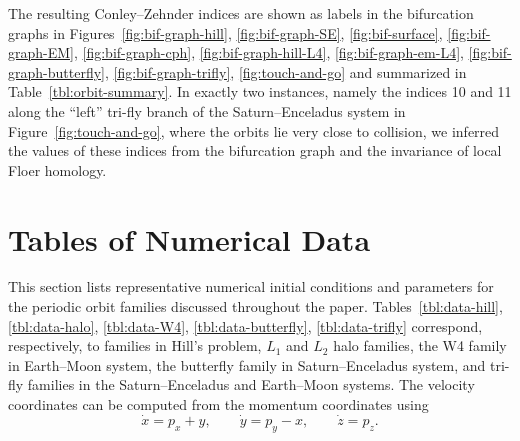 \documentclass[pdflatex,sn-mathphys-ay]{sn-jnl}%
\theoremstyle{thmstyleone}%
\theoremstyle{thmstyletwo}%
\theoremstyle{thmstylethree}%
\begin{document}
The resulting Conley--Zehnder indices are shown as labels in the bifurcation graphs in Figures~\ref{fig:bif-graph-hill}, \ref{fig:bif-graph-SE}, \ref{fig:bif-surface}, \ref{fig:bif-graph-EM}, \ref{fig:bif-graph-cph}, \ref{fig:bif-graph-hill-L4}, \ref{fig:bif-graph-em-L4}, \ref{fig:bif-graph-butterfly}, \ref{fig:bif-graph-trifly}, \ref{fig:touch-and-go} and summarized in Table~\ref{tbl:orbit-summary}.
In exactly two instances, namely the indices 10 and 11 along the ``left'' tri-fly branch of the Saturn--Enceladus system in Figure~\ref{fig:touch-and-go}, where the orbits lie very close to collision, we inferred the values of these indices from the bifurcation graph and the invariance of local Floer homology.





\section{Tables of Numerical Data}
\label{sec:data}
This section lists representative numerical initial conditions and parameters for the periodic orbit families discussed throughout the paper.  
Tables~\ref{tbl:data-hill}, \ref{tbl:data-halo}, \ref{tbl:data-W4}, \ref{tbl:data-butterfly}, \ref{tbl:data-trifly} correspond, respectively, to families in Hill's problem, $L_1$ and $L_2$ halo families, the W4 family in Earth--Moon system, the butterfly family in Saturn--Enceladus system, and tri-fly families in the Saturn--Enceladus and Earth--Moon systems.
The velocity coordinates can be computed from the momentum coordinates using
\[
\dot{x} = p_x + y, \qquad
\dot{y} = p_y - x, \qquad
\dot{z} = p_z .
\]
\end{document}
